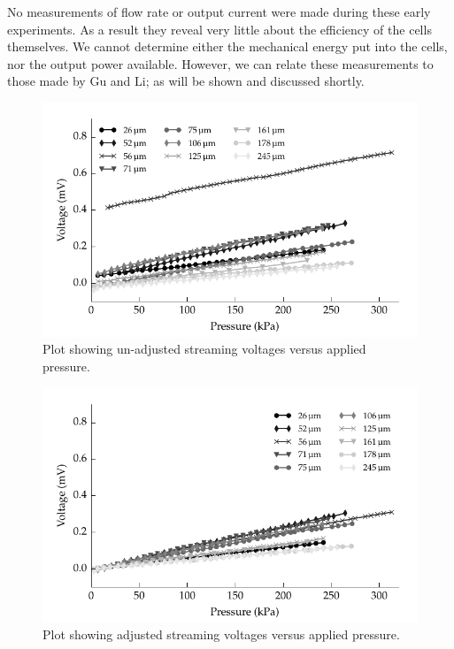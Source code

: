 No measurements of flow rate or output current were made during these early experiments.
As a result they reveal very little about the efficiency of the cells themselves.
We cannot determine either the mechanical energy put into the cells, nor the output power available.
However, we can relate these measurements to those made by Gu and Li; as will be shown and discussed shortly.

\begin{figure}
    \centering
    \includegraphics{content/pt1/01-PowerHarvesting/graphics/graph_streamingVoltageGradient_vs_height_noCorrection}
    \caption{\label{fig:streamingCell_all_unadjusted}Plot showing un-adjusted streaming voltages versus applied pressure.}
\end{figure}

\begin{figure}
    \centering
    \includegraphics{content/pt1/01-PowerHarvesting/graphics/graph_streamingVoltageGradient_vs_height}
    \caption{\label{fig:streamingCell_all_adjusted}Plot showing adjusted streaming voltages versus applied pressure.}
\end{figure}

